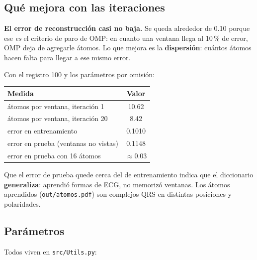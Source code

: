 \documentclass[11pt,letterpaper]{article}
\begin{document}
\subsection*{Qué mejora con las iteraciones}

\begin{ojo}
    \textbf{El error de reconstrucción casi no baja.} Se queda alrededor
    de 0.10 porque ese \emph{es} el criterio de paro de OMP: en cuanto
    una ventana llega al 10\,\% de error, OMP deja de agregarle
    átomos. Lo que mejora es la \textbf{dispersión}: cuántos átomos
    hacen falta para llegar a ese mismo error.
\end{ojo}

Con el registro 100 y los parámetros por omisión:

\begin{center}
\begin{tabular}{lc}
    \toprule
    \textbf{Medida} & \textbf{Valor} \\
    \midrule
    átomos por ventana, iteración 1        & 10.62 \\
    átomos por ventana, iteración 20       & 8.42 \\
    error en entrenamiento                 & 0.1010 \\
    error en prueba (ventanas no vistas)   & 0.1148 \\
    error en prueba con 16 átomos          & $\approx 0.03$ \\
    \bottomrule
\end{tabular}
\end{center}

Que el error de prueba quede cerca del de entrenamiento indica que el
diccionario \textbf{generaliza}: aprendió formas de ECG, no memorizó
ventanas. Los átomos aprendidos (\texttt{out/atomos.pdf}) son complejos
QRS en distintas posiciones y polaridades.

\subsection*{Parámetros}

Todos viven en \texttt{src/Utils.py}:
\end{document}
